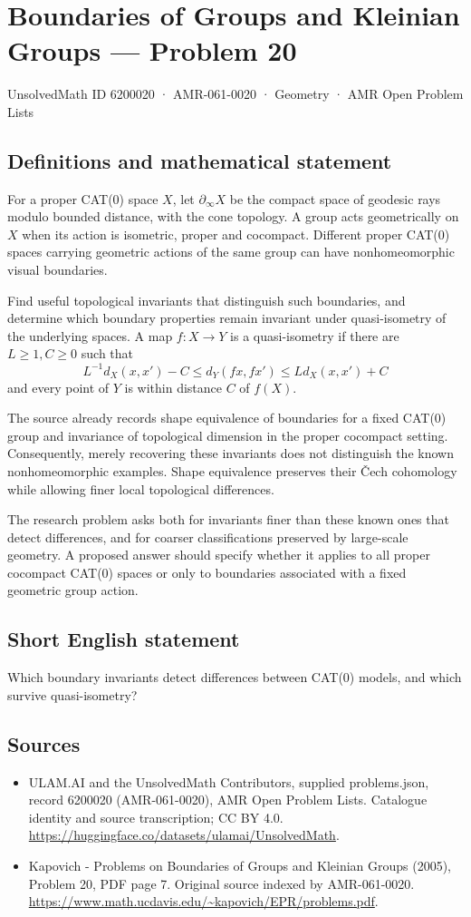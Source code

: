 \documentclass[11pt,a4paper]{article}
\begin{document}
\section*{Boundaries of Groups and Kleinian Groups — Problem 20}\label{6200020}
{\small UnsolvedMath ID 6200020 · AMR-061-0020 · Geometry · AMR Open Problem Lists}
\subsection{Definitions and mathematical statement}
For a proper CAT(0) space $X$, let $\partial_\infty X$ be the compact space of geodesic rays modulo bounded distance, with the cone topology. A group acts geometrically on $X$ when its action is isometric, proper and cocompact. Different proper CAT(0) spaces carrying geometric actions of the same group can have nonhomeomorphic visual boundaries.

Find useful topological invariants that distinguish such boundaries, and determine which boundary properties remain invariant under quasi-isometry of the underlying spaces. A map $f:X\to Y$ is a quasi-isometry if there are $L\geq1,C\geq0$ such that
\[
 L^{-1}d_X(x,x')-C\leq d_Y(fx,fx')\leq Ld_X(x,x')+C
\]
and every point of $Y$ is within distance $C$ of $f(X)$.

The source already records shape equivalence of boundaries for a fixed CAT(0) group and invariance of topological dimension in the proper cocompact setting. Consequently, merely recovering these invariants does not distinguish the known nonhomeomorphic examples. Shape equivalence preserves their \v{C}ech cohomology while allowing finer local topological differences.

The research problem asks both for invariants finer than these known ones that detect differences, and for coarser classifications preserved by large-scale geometry. A proposed answer should specify whether it applies to all proper cocompact CAT(0) spaces or only to boundaries associated with a fixed geometric group action.
\subsection{Short English statement}
Which boundary invariants detect differences between CAT(0) models, and which survive quasi-isometry?
\subsection{Sources}
\begin{itemize}
\item[S1] ULAM.AI and the UnsolvedMath Contributors, supplied problems.json, record 6200020 (AMR-061-0020), AMR Open Problem Lists. Catalogue identity and source transcription; CC BY 4.0.
\url{https://huggingface.co/datasets/ulamai/UnsolvedMath}.
\item[S2] Kapovich - Problems on Boundaries of Groups and Kleinian Groups (2005), Problem 20, PDF page 7. Original source indexed by AMR-061-0020.
\url{https://www.math.ucdavis.edu/~kapovich/EPR/problems.pdf}.
\end{itemize}
\end{document}
